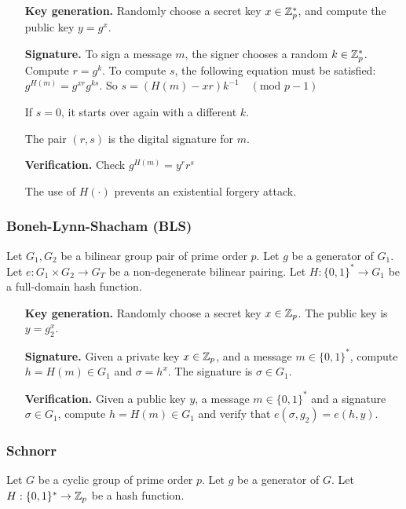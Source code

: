 \begin{itemize}[align = left, leftmargin=*]
	\item[\textbf{Key generation.}]	Randomly choose a secret key $x \in {\mathbb Z}_p^\ast$, and compute the public key $y = g^x$.
	
	\item[\textbf{Signature.}]To sign a message $m$, the signer chooses a random $k \in {\mathbb Z}_p^\ast$.
Compute $ r = g^k$. To compute $s$, the following equation must be satisfied: $g^{H(m)} = g^{xr} g^{ks}$.
So $s = \left( H(m) - xr \right) k^{-1} \quad (\text{mod } p-1)$

If $s=0$, it starts over again with a different $k$.

The pair $(r,s)$ is the digital signature for $m$.

	\item[\textbf{Verification.}]Check $g^{H(m)} = y^r r^s$

The use of $H( \cdot )$ prevents an existential forgery attack.

\end{itemize}

\subsubsection*{Boneh-Lynn-Shacham (BLS)}
\cite{BonehLS01}
Let $G_1,G_2$ be a bilinear group pair of prime order $p$. Let $g$ be a generator of $G_1$. Let $e:G_1 \times G_2 \rightarrow G_T$ be a non-degenerate bilinear pairing. Let $H: \{0,1\}^* \rightarrow G_1$ be a full-domain hash function.

\begin{itemize}[align = left, leftmargin=*]
	\item[\textbf{Key generation.}] Randomly choose a secret key $x \in {\mathbb Z}_p$. The public key is $y = g_2^x$.
	
	\item[\textbf{Signature.}] Given a private key $x \in {\mathbb Z}_p$, and a message $m \in \{0,1\}^*$, compute $h = H(m) \in G_1$ and $\sigma = h^x$. The signature is $\sigma \in G_1$.
	
	\item[\textbf{Verification.}] Given a public key $y$, a message $m \in \{0,1\}^*$ and a signature $\sigma \in G_1$, compute $h = H(m) \in G_1$ and verify that $e(\sigma,g_2) = e \left( h, y \right)$.
	
\end{itemize}

\subsubsection*{Schnorr}
\cite{Schnorr90}
Let $G$ be a cyclic group of prime order $p$. Let $g$ be a generator of $G$. Let $H : \{0,1\}^\ast \rightarrow {\mathbb Z}_p$ be a hash function.

